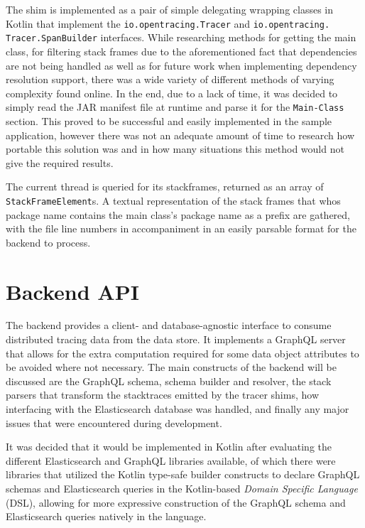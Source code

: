 \documentclass[12pt,pdftex,titlepage]{report}
\begin{document}
                The shim is implemented as a pair of simple delegating wrapping classes in Kotlin that implement the \texttt{io.opentracing.Tracer} and \texttt{io.opentracing.\\Tracer.SpanBuilder} interfaces. While
                researching methods for getting the main class, for filtering stack frames due to the aforementioned fact that dependencies are not being handled as well as for future work when implementing dependency 
                resolution support, there was a wide variety of different methods of varying complexity found online. In the end, due to a lack of time, it was decided to simply read the JAR manifest file at runtime
                and parse it for the \texttt{Main-Class} section. This proved to be successful and easily implemented in the sample application, however there was not an adequate amount of time to research how portable
                this solution was and in how many situations this method would not give the required results.

                The current thread is queried for its stackframes, returned as an array of \texttt{StackFrameElement}s. A textual representation of the stack frames that whos package name contains the main class's package
                name as a prefix are gathered, with the file line numbers in accompaniment in an easily parsable format for the backend to process.
            
        \section{Backend API}
        \label{sec:backend}
            The backend provides a client- and database-agnostic interface to consume distributed tracing data from the data store. It implements a GraphQL server that allows for the extra computation
            required for some data object attributes to be avoided where not necessary. The main constructs of the backend will be discussed are the GraphQL schema, schema builder and resolver, the stack
            parsers that transform the stacktraces emitted by the tracer shims, how interfacing with the Elasticsearch database was handled, and finally any major issues that were encountered during development.

            It was decided that it would be implemented in Kotlin after evaluating the different Elasticsearch and GraphQL libraries available, of which there were libraries 
            that utilized the Kotlin type-safe builder constructs\cite{dsl} to declare GraphQL schemas and Elasticsearch queries in the Kotlin-based \textit{Domain Specific Language} (DSL), allowing
            for more expressive construction of the GraphQL schema and Elasticsearch queries natively in the language. 
            
\end{document}
